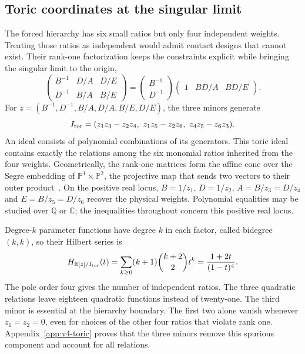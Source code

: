 \documentclass[aps,pre,reprint,amsmath,amssymb,longbibliography]{revtex4-2}
\begin{document}
\subsection{Toric coordinates at the singular limit}
\label{sec:v4-toric}
The forced hierarchy has six small ratios but only four independent
weights. Treating those ratios as independent would admit contact
designs that cannot exist. Their rank-one factorization keeps the
constraints explicit while bringing the singular limit to the origin,
\begin{equation}
 \begin{pmatrix}B^{-1}&D/A&D/E\\D^{-1}&B/A&B/E\end{pmatrix}
 =\begin{pmatrix}B^{-1}\\D^{-1}\end{pmatrix}
   \begin{pmatrix}1&BD/A&BD/E\end{pmatrix}.
 \label{eq:v4-segre}
\end{equation}
For $z=(B^{-1},D^{-1},B/A,D/A,B/E,D/E)$, the three minors generate
\begin{equation}
 I_{\rm tor}=(z_1z_3-z_2z_4,\ z_1z_5-z_2z_6,\ z_4z_5-z_6z_3).
 \label{eq:v4-toric-ideal}
\end{equation}
An ideal consists of polynomial combinations of its generators. This
toric ideal contains exactly the relations among the six monomial
ratios inherited from the four weights.
Geometrically, the rank-one matrices form the affine cone over the
Segre embedding of $\mathbb P^1\times\mathbb P^2$, the projective
map that sends two vectors to their outer product~\cite{MathStacksSegre}.
On the positive real locus, $B=1/z_1$, $D=1/z_2$,
$A=B/z_3=D/z_4$ and $E=B/z_5=D/z_6$ recover the physical weights.
Polynomial equalities may be studied over $\mathbb Q$ or $\mathbb C$;
the inequalities throughout concern this positive real locus.

Degree-$k$ parameter functions have degree $k$ in each factor,
called bidegree $(k,k)$, so their Hilbert series is
\begin{equation}
 H_{\mathbb R[z]/I_{\rm tor}}(t)
 =\sum_{k\ge0}(k+1)\binom{k+2}{2}t^k
 =\frac{1+2t}{(1-t)^4}.
 \label{eq:v4-toric-hilbert}
\end{equation}
The pole order four gives the number of independent ratios. The three
quadratic relations leave eighteen quadratic functions instead of
twenty-one. The third minor is essential at the hierarchy boundary.
The first two alone vanish whenever $z_1=z_2=0$, even for choices of
the other four ratios that violate rank one. Appendix~\ref{app:v4-toric}
proves that the three minors remove this spurious component and
account for all relations.
\end{document}
